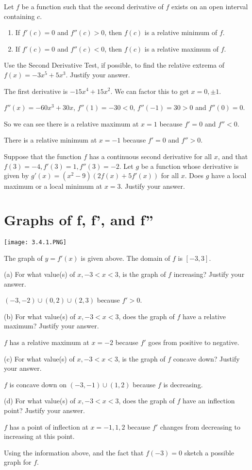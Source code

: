\documentclass[../bccalc.tex]{subfiles}
\begin{document}
Let $f$ be a function such that the second derivative of $f$ exists on an open interval containing $c$.
\begin{enumerate}
    \item If $f'(c)=0$ and $f''(c)>0$, then $f(c)$ is a relative minimum of $f$.
    \item If $f'(c)=0$ and $f''(c)<0$, then $f(c)$ is a relative maximum of $f$.
\end{enumerate}
\pagebreak
\begin{example}
    Use the Second Derivative Test, if possible, to find the relative extrema of $f(x)=-3x^5+5x^3$. Justify your answer.

    The first derivative is $-15x^4+15x^2$. We can factor this to get $x=0,\pm 1$.

    $f''(x)=-60x^3+30x$, $f''(1)=-30<0$, $f''(-1)=30>0$ and $f''(0)=0$.

    So we can see there is a relative maximum at $x=1$ because $f'=0$ and $f''<0$.

    There is a relative minimum at $x=-1$ because $f'=0$ and $f''>0$.
\end{example}

\ex Suppose that the function $f$ has a continuous second derivative for all $x$, and that $f(3)=-4, f'(3)=1, f''(3)=-2$. Let $g$ be a function whose derivative is given by $g'(x)=(x^2-9)(2f(x)+5f'(x))$ for all $x$. Does $g$ have a local maximum or a local minimum at $x=3$. Justify your answer.

\section{Graphs of f, f', and f''}
\begin{example}
    \begin{center}
        \texttt{[image: 3.4.1.PNG]}
    \end{center}
    The graph of $y=f'(x)$ is given above. The domain of $f$ is $[-3,3]$.

    (a) For what value(s) of $x, -3<x<3$, is the graph of $f$ increasing? Justify your answer.

    $(-3,-2)\cup (0,2)\cup (2,3)$ because $f'>0$.

    (b) For what value(s) of $x,-3<x<3$, does the graph of $f$ have a relative maximum? Justify your answer.

    $f$ has a relative maximum at $x=-2$ because $f'$ goes from positive to negative.

    (c) For what value(s) of $x, -3<x<3$, is the graph of $f$ concave down? Justify your answer.

    $f$ is concave down on $(-3,-1)\cup (1,2)$ because $f$ is decreasing.

    (d) For what value(s) of $x,-3<x<3$, does the graph of $f$ have an inflection point? Justify your answer.

    $f$ has a point of inflection at $x=-1,1,2$ because $f'$ changes from decreasing to increasing at this point.
\end{example}
\ex Using the information above, and the fact that $f(-3)=0$ sketch a possible graph for $f$.
\end{document}
